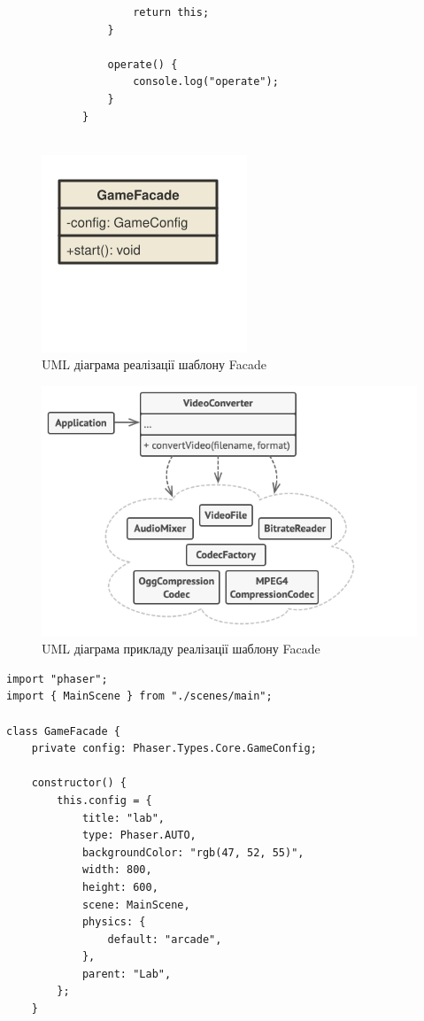 \documentclass[oneside,14pt]{extarticle}
\begin{document}
\begin{normalsize}
\begin{small}
\begin{lstlisting}
					return this;
				}
				
				operate() {
					console.log("operate");
				}
			}
			
		\end{lstlisting}
	\end{small}
	
	\begin{figure}[H]
		\centering
		\includegraphics{facade}
		\caption{UML діаграма реалізації шаблону Facade}
	\end{figure}
	
		\begin{figure}[H]
		\centering
		\includegraphics{facade-ex}
		\caption{UML діаграма прикладу реалізації шаблону Facade}
	\end{figure}
	
	\begin{small}
		\begin{lstlisting}
import "phaser";
import { MainScene } from "./scenes/main";

class GameFacade {
	private config: Phaser.Types.Core.GameConfig;
	
	constructor() {
		this.config = {
			title: "lab",
			type: Phaser.AUTO,
			backgroundColor: "rgb(47, 52, 55)",
			width: 800,
			height: 600,
			scene: MainScene,
			physics: {
				default: "arcade",
			},
			parent: "Lab",
		};
	}
	

\end{lstlisting}
\end{small}
\end{normalsize}
\end{document}
